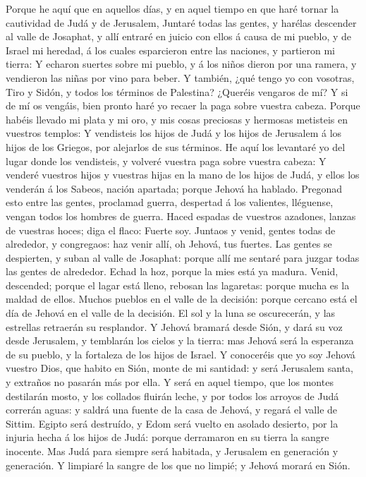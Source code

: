  Porque he aquí que en aquellos días, y en aquel tiempo en
que haré tornar la cautividad de Judá y de Jerusalem, 
Juntaré todas las gentes, y harélas descender al valle de Josaphat, y
allí entraré en juicio con ellos á causa de mi pueblo, y de Israel mi
heredad, á los cuales esparcieron entre las naciones, y partieron mi
tierra:  Y echaron suertes sobre mi pueblo, y á los niños
dieron por una ramera, y vendieron las niñas por vino para beber.
 Y también, ¿qué tengo yo con vosotras, Tiro y Sidón, y
todos los términos de Palestina? ¿Queréis vengaros de mí? Y si de mí os
vengáis, bien pronto haré yo recaer la paga sobre vuestra cabeza.
 Porque habéis llevado mi plata y mi oro, y mis cosas
preciosas y hermosas metisteis en vuestros templos:  Y
vendisteis los hijos de Judá y los hijos de Jerusalem á los hijos de los
Griegos, por alejarlos de sus términos.  He aquí los
levantaré yo del lugar donde los vendisteis, y volveré vuestra paga
sobre vuestra cabeza:  Y venderé vuestros hijos y vuestras
hijas en la mano de los hijos de Judá, y ellos los venderán á los
Sabeos, nación apartada; porque Jehová ha hablado.  Pregonad
esto entre las gentes, proclamad guerra, despertad á los valientes,
lléguense, vengan todos los hombres de guerra.  Haced
espadas de vuestros azadones, lanzas de vuestras hoces; diga el flaco:
Fuerte soy.  Juntaos y venid, gentes todas de alrededor, y
congregaos: haz venir allí, oh Jehová, tus fuertes.  Las
gentes se despierten, y suban al valle de Josaphat: porque allí me
sentaré para juzgar todas las gentes de alrededor.  Echad
la hoz, porque la mies está ya madura. Venid, descended; porque el lagar
está lleno, rebosan las lagaretas: porque mucha es la maldad de ellos.
 Muchos pueblos en el valle de la decisión: porque cercano
está el día de Jehová en el valle de la decisión.  El sol y
la luna se oscurecerán, y las estrellas retraerán su resplandor.
 Y Jehová bramará desde Sión, y dará su voz desde
Jerusalem, y temblarán los cielos y la tierra: mas Jehová será la
esperanza de su pueblo, y la fortaleza de los hijos de Israel.
 Y conoceréis que yo soy Jehová vuestro Dios, que habito en
Sión, monte de mi santidad: y será Jerusalem santa, y extraños no
pasarán más por ella.  Y será en aquel tiempo, que los
montes destilarán mosto, y los collados fluirán leche, y por todos los
arroyos de Judá correrán aguas: y saldrá una fuente de la casa de
Jehová, y regará el valle de Sittim.  Egipto será
destruído, y Edom será vuelto en asolado desierto, por la injuria hecha
á los hijos de Judá: porque derramaron en su tierra la sangre inocente.
 Mas Judá para siempre será habitada, y Jerusalem en
generación y generación.  Y limpiaré la sangre de los que
no limpié; y Jehová morará en Sión.
